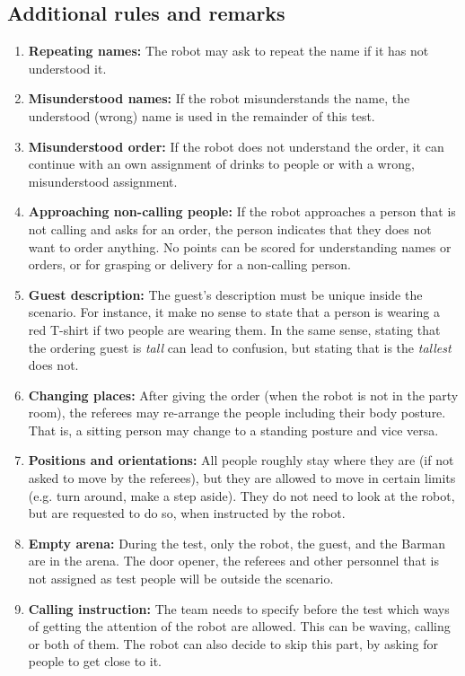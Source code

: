\subsection{Additional rules and remarks}
\begin{enumerate}
	\item \textbf{Repeating names:} The robot may ask to repeat the name if it has not understood it.

	\item \textbf{Misunderstood names:} If the robot misunderstands the name, the understood (wrong) name is used in the remainder of this test.

	\item \textbf{Misunderstood order:} If the robot does not understand the order, it can continue with an own assignment of drinks to people or with a wrong, misunderstood assignment.

	\item \textbf{Approaching non-calling people:} If the robot approaches a person that is not calling and asks for an order, the person indicates that they does not want to order anything. No points can be scored for understanding names or orders, or for grasping or delivery for a non-calling person.

	\item \textbf{Guest description:} The guest's description must be unique inside the scenario. For instance, it make no sense to state that a person is wearing a red T-shirt if two people are wearing them. In the same sense, stating that the ordering guest is \textit{tall} can lead to confusion, but stating that is the \textit{tallest} does not.

	\item \textbf{Changing places:} After giving the order (when the robot is not in the party room), the referees may re-arrange the people including their body posture. That is, a sitting person may change to a standing posture and vice versa.

	\item \textbf{Positions and orientations:} All people roughly stay where they are (if not asked to move by the referees), but they are allowed to move in certain limits (e.g. turn around, make a step aside). They do not need to look at the robot, but are requested to do so, when instructed by the robot.

	\item \textbf{Empty arena:} During the test, only the robot, the guest, and the Barman are in the arena. The door opener, the referees and other personnel that is not assigned as test people will be outside the scenario.
	
	\item \textbf{Calling instruction:} The team needs to specify before the test which ways of getting the attention of the robot are allowed. This can be waving, calling or both of them. The robot can also decide to skip this part, by asking for people to get close to it.
\end{enumerate}

